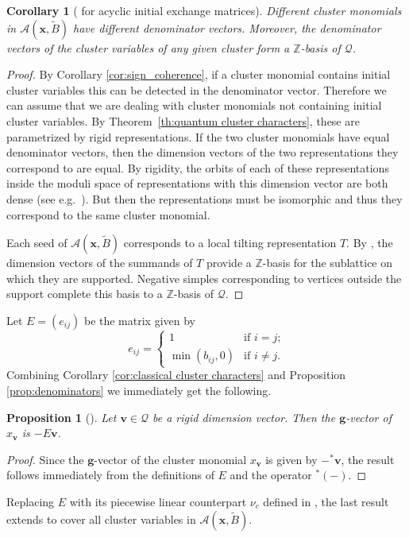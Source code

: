 \documentclass[12pt]{amsart}
\newtheorem{corollary}[theorem]{Corollary}
\newtheorem{proposition}[theorem]{Proposition}
\newcommand{\bfg}{\mathbf{g}}
\newcommand{\bfv}{\mathbf{v}}
\newcommand{\bfx}{\mathbf{x}}
\newcommand{\cA}{\mathcal{A}}
\newcommand{\cQ}{\mathcal{Q}}
\newcommand{\ZZ}{\mathbb{Z}}
\begin{document}
  \begin{corollary}[{\cite[Conjecture 7.6]{fomin-zelevinsky4}} for acyclic initial exchange matrices]
    \label{cor:d_vect basis}
    Different cluster monomials in $\cA(\bfx,\widetilde{B})$ have different denominator vectors.
    Moreover, the denominator vectors of the cluster variables of any given cluster form a $\ZZ$-basis of $\cQ$.
  \end{corollary}
  \begin{proof}
    By Corollary \ref{cor:sign_coherence}, if a cluster monomial contains initial cluster variables this can be detected in the denominator vector.
    Therefore we can assume that we are dealing with cluster monomials not containing initial cluster variables.
    By Theorem~\ref{th:quantum cluster characters}, these are parametrized by rigid representations.
    If the two cluster monomials have equal denominator vectors, then the dimension vectors of the two representations they correspond to are equal.
    By rigidity, the orbits of each of these representations inside the moduli space of representations with this dimension vector are both dense (see e.g.\ \cite[Corollary 2.2.5]{brion}).
    But then the representations must be isomorphic and thus they correspond to the same cluster monomial.

    Each seed of $\cA(\bfx,\widetilde{B})$ corresponds to a local tilting representation $T$.
    By \cite[Lemma 4.3 and Theorem 4.5]{happel-ringel}, the dimension vectors of the summands of $T$ provide a $\ZZ$-basis for the sublattice on which they are supported.
    Negative simples corresponding to vertices outside the support complete this basis to a $\ZZ$-basis of $\cQ$.
  \end{proof}
 
  Let $E=(e_{ij})$ be the matrix given by
  \[
    e_{ij}
    =
    \begin{cases} 
      1 & \text{if $i=j$;}\\ 
      \min(b_{ij},0) & \text{if $i\ne j$.}
    \end{cases}
  \]
  Combining Corollary \ref{cor:classical cluster characters} and Proposition \ref{prop:denominators} we immediately get the following.
  \begin{proposition}[{\cite[Conjecture 3.21]{reading-speyer}}]
    \label{prop:d to g}
    Let $\bfv\in\cQ$ be a rigid dimension vector.
    Then the $\bfg$-vector of $x_\bfv$ is $-E\bfv$.
  \end{proposition}
  \begin{proof}
    Since the $\bfg$-vector of the cluster monomial $x_\bfv$ is given by $-{}^*\bfv$, the result follows immediately from the definitions of $E$ and the operator ${}^*(-)$.
  \end{proof}
  Replacing $E$ with its piecewise linear counterpart $\nu_c$ defined in \cite{reading-stella-2}, the last result extends to cover all cluster variables in $\cA(\bfx,\widetilde{B})$.
\end{document}
